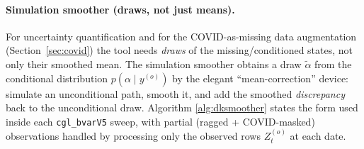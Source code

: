 \documentclass[11pt]{article}
\theoremstyle{definition}
\theoremstyle{remark}
\begin{document}
\paragraph{Simulation smoother (draws, not just means).} For
uncertainty quantification and for the COVID-as-missing data
augmentation (Section~\ref{sec:covid}) the tool needs \emph{draws} of the
missing/conditioned states, not only their smoothed mean. The
\citet{DurbinKoopman2002} simulation smoother obtains a draw
$\tilde\alpha$ from the conditional distribution
$p(\alpha\mid y^{(o)})$ by the elegant ``mean-correction'' device:
simulate an unconditional path, smooth it, and add the smoothed
\emph{discrepancy} back to the unconditional draw. Algorithm
\ref{alg:dksmoother} states the form used inside each
\texttt{cgl\_bvarV5} sweep, with partial (ragged + COVID-masked)
observations handled by processing only the observed rows
$Z_t^{(o)}$ at each date.
\end{document}
